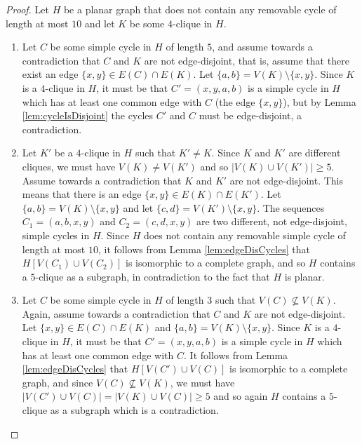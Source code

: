 \documentclass{article}
\theoremstyle{definition}
\newtheorem{lemma}{Lemma}[section]
\begin{document}
\begin{proof} Let $H$ be a planar graph that does not contain any removable cycle of length at most $10$ and let $K$ be some $4$-clique in $H$.
\begin{enumerate}
	\item Let $C$ be some simple cycle in $H$ of length $5$, and assume towards a contradiction that $C$ and $K$ are not edge-disjoint, that is, assume that there exist an edge $\{x,y\} \in E(C) \cap E(K)$. Let $\{a,b\} = V(K) \setminus \{x,y\}$. Since $K$ is a $4$-clique in $H$, it must be that $C' = (x,y,a,b)$ is a simple cycle in $H$ which has at least one common edge with $C$ (the edge $\{x,y\}$), but by Lemma \ref{lem:cycleIsDisjoint} the cycles $C'$ and $C$ must be edge-disjoint, a contradiction.
	\item Let $K'$ be a $4$-clique in $H$ such that $K' \ne K$. Since $K$ and $K'$ are different cliques, we must have $V(K) \ne V(K')$ and so $|V(K) \cup V(K')| \ge 5$. Assume towards a contradiction that $K$ and $K'$ are not edge-disjoint. This means that there is an edge $\{x,y\} \in E(K) \cap E(K')$. Let $\{a,b\} = V(K) \setminus \{x,y\}$ and let $\{c,d\} = V(K') \setminus \{x,y\}$. The sequences $C_{1} = (a,b,x,y)$ and $C_{2} = (c,d,x,y)$ are two different, not edge-disjoint, simple cycles in $H$. Since $H$ does not contain any removable simple cycle of length at most $10$, it follows from Lemma \ref{lem:edgeDisCycles} that $H[V(C_{1}) \cup V(C_{2})]$ is isomorphic to a complete graph, and so $H$ contains a $5$-clique as a subgraph, in contradiction to the fact that $H$ is planar.
	\item Let $C$ be some simple cycle in $H$ of length $3$ such that $V(C) \not\subseteq V(K)$. Again, assume towards a contradiction that $C$ and $K$ are not edge-disjoint. Let $\{x,y\} \in E(C) \cap E(K)$ and $\{a,b\} = V(K) \setminus \{x,y\}$. Since $K$ is a $4$-clique in $H$, it must be that $C' = (x,y,a,b)$ is a simple cycle in $H$ which has at least one common edge with $C$. It follows from Lemma \ref{lem:edgeDisCycles} that $H[V(C') \cup V(C)]$ is isomorphic to a complete graph, and since $V(C) \not\subseteq V(K)$, we must have $|V(C') \cup V(C)|=|V(K) \cup V(C)| \ge 5$ and so again $H$ contains a $5$-clique as a subgraph which is a contradiction.\qedhere\end{enumerate}\end{proof}

\end{document}
